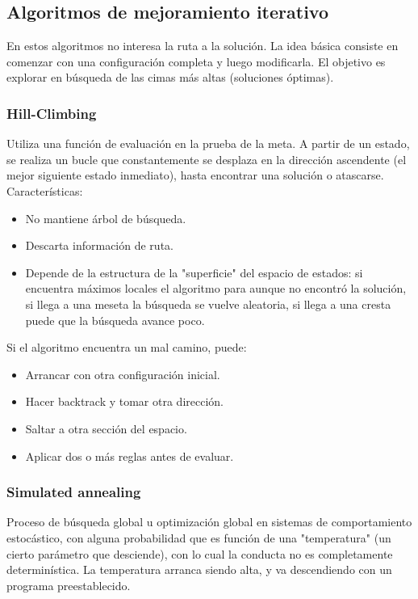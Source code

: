 \documentclass[a4paper,10pt]{paper}
\begin{document}
\subsection{Algoritmos de mejoramiento iterativo}
En estos algoritmos no interesa la ruta a la solución. La idea básica
consiste en comenzar con una configuración completa y luego modificarla.
El objetivo es explorar en búsqueda de las cimas más altas (soluciones
óptimas).

\subsubsection{Hill-Climbing}
Utiliza una función de evaluación en la prueba de la meta. A partir de un
estado, se realiza un bucle que constantemente se desplaza en la dirección
ascendente (el mejor siguiente estado inmediato), hasta encontrar una
solución o atascarse. Características:
\begin{itemize}
    \item No mantiene árbol de búsqueda.
    \item Descarta información de ruta.
    \item Depende de la estructura de la "superficie" del espacio de
    estados: si encuentra máximos locales el algoritmo para aunque no
    encontró la solución, si llega a una meseta la búsqueda se vuelve
    aleatoria, si llega a una cresta puede que la búsqueda avance poco.
\end{itemize}
Si el algoritmo encuentra un mal camino, puede:
\begin{itemize}
    \item Arrancar con otra configuración inicial.
    \item Hacer backtrack y tomar otra dirección.
    \item Saltar a otra sección del espacio.
    \item Aplicar dos o más reglas antes de evaluar.
\end{itemize}

\subsubsection{Simulated annealing}
Proceso de búsqueda global u optimización global en sistemas de
comportamiento estocástico, con alguna probabilidad que es función
de una "temperatura" (un cierto parámetro que desciende), con lo cual
la conducta no es completamente determinística. La temperatura arranca
siendo alta, y va descendiendo con un programa preestablecido.
\end{document}
